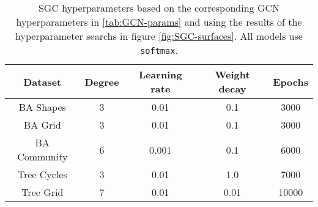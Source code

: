 \begin{table}
    \centering
    \begin{tabular}{c|cccc}
        \textbf{Dataset} &
        \textbf{Degree} &
        \textbf{Learning rate} &
        \textbf{Weight decay} &
        \textbf{Epochs} \\
        \midrule
        BA Shapes       & 3 & 0.01 & 0.1 & 3000 \\
        BA Grid         & 3 & 0.01 & 0.1 & 3000 \\
        BA Community    & 6 & 0.001 & 0.1 & 6000 \\
        Tree Cycles     & 3 & 0.01 & 1.0 & 7000 \\
        Tree Grid       & 7 & 0.01 & 0.01 & 10000 \\
    \end{tabular}
    \caption{SGC hyperparameters based on the corresponding GCN hyperparameters in \ref{tab:GCN-params} and using the results of the hyperparameter searchs in figure \ref{fig:SGC-surfaces}. All models use \texttt{softmax}.}
    \label{tab:SGC-params}
\end{table}


